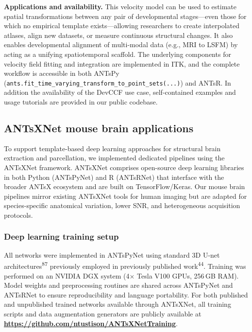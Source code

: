 \documentclass[
  12pt,
]{article}
\begin{document}
\textbf{Applications and availability.} This velocity model can be used
to estimate spatial transformations between any pair of developmental
stages---even those for which no empirical template exists---allowing
researchers to create interpolated atlases, align new datasets, or
measure continuous structural changes. It also enables developmental
alignment of multi-modal data (e.g., MRI to LSFM) by acting as a
unifying spatiotemporal scaffold. The underlying components for velocity
field fitting and integration are implemented in ITK, and the complete
workflow is accessible in both ANTsPy
(\texttt{ants.fit\_time\_varying\_transform\_to\_point\_sets(...)}) and
ANTsR. In addition the availability of the DevCCF use case,
self-contained examples and usage tutorials are provided in our public
codebase.

\subsection{ANTsXNet mouse brain
applications}\label{antsxnet-mouse-brain-applications}

To support template-based deep learning approaches for structural brain
extraction and parcellation, we implemented dedicated pipelines using
the ANTsXNet framework. ANTsXNet comprises open-source deep learning
libraries in both Python (ANTsPyNet) and R (ANTsRNet) that interface
with the broader ANTsX ecosystem and are built on TensorFlow/Keras. Our
mouse brain pipelines mirror existing ANTsXNet tools for human imaging
but are adapted for species-specific anatomical variation, lower SNR,
and heterogeneous acquisition protocols.

\subsubsection{Deep learning training
setup}\label{deep-learning-training-setup}

All networks were implemented in ANTsPyNet using standard 3D U-net
architectures\textsuperscript{87} previously employed in previously
published work\textsuperscript{44}. Training was performed on an NVIDIA
DGX system (4\(\times\) Tesla V100 GPUs, 256\,GB RAM). Model weights and
preprocessing routines are shared across ANTsPyNet and ANTsRNet to
ensure reproducibility and language portability. For both published and
unpublished trained networks available through ANTsXNet, all training
scripts and data augmentation generators are publicly available at
\textbf{\url{https://github.com/ntustison/ANTsXNetTraining}}.
\end{document}
